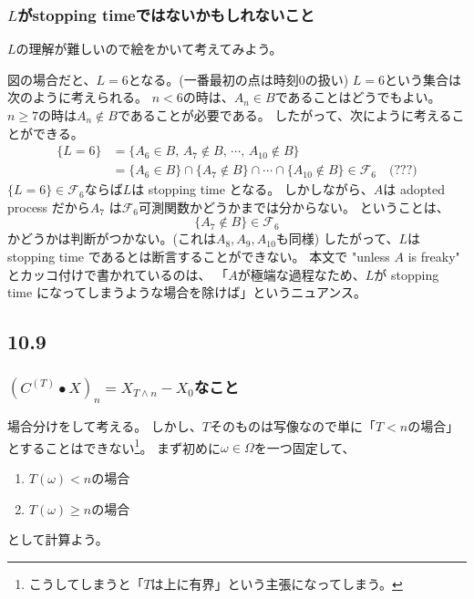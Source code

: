       \subsubsection{$L$がstopping timeではないかもしれないこと}
        $L$の理解が難しいので絵をかいて考えてみよう。


        図の場合だと、$L = 6$となる。(一番最初の点は時刻0の扱い)
        $L = 6$という集合は次のように考えられる。
        $n < 6$の時は、$A_n \in B$であることはどうでもよい。
        $n \ge 7 $の時は$A_n \notin B$であることが必要である。
        したがって、次にように考えることができる。
        \begin{align*}
          \{L = 6\} &= \{A_6 \in B, \, A_7 \notin B, \, \cdots ,\, A_{10} \notin B\}\\
          &= \{A_6 \in B\} \cap \{A_7 \notin B\} \cap \cdots \cap \{A_{10} \notin B\} \in \mathcal{F}_6 \quad \text{(???)}
        \end{align*}
        $\{L = 6 \} \in \mathcal{F}_6$ならば$L$は stopping time となる。
        しかしながら、$A$は adopted process だから$A_7$
        は$\mathcal{F}_6$可測関数かどうかまでは分からない。
        ということは、
        \[
          \{A_7 \notin B\} \in \mathcal{F}_6
        \]
        かどうかは判断がつかない。(これは$A_8,A_9,A_{10}$も同様)
        したがって、$L$は stopping time であるとは断言することができない。
        本文で "unless $A$ is freaky" とカッコ付けで書かれているのは、
        「$A$が極端な過程なため、$L$が stopping time になってしまうような場合を除けば」というニュアンス。

    \subsection{10.9}
      \subsubsection{$(C^{(T)} \bullet X)_n = X_{T \wedge n} - X_0$なこと}
        場合分けをして考える。
        しかし、$T$そのものは写像なので単に「$T < n$の場合」とすることはできない\footnote{こうしてしまうと「$T$は上に有界」という主張になってしまう。}。
        まず初めに$\omega \in \Omega$を一つ固定して、
        \begin{enumerate}
          \item $T(\omega) < n$の場合
          \item $T(\omega) \ge n$の場合
        \end{enumerate}
        として計算よう。

